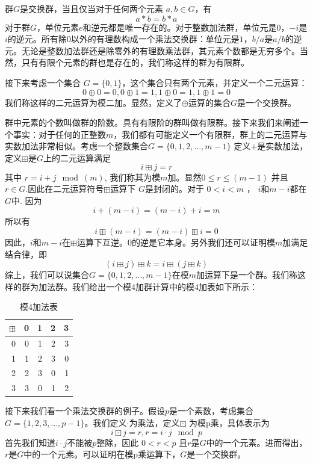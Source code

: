 \documentclass[10pt,a4paper,UTF8]{article}
\begin{document}
群\(G\)是交换群，当且仅当对于任何两个元素 \(a,b\in G\)，有 \[a*b=b*a\] 对于群\(G\)，单位元素\(e\)和逆元都是唯一存在的。对于整数加法群，单位元是\(0\)，\(-i\)是\(i\)的逆元。所有除0以外的有理数构成一个乘法交换群：单位元是\(1\)，\(b/a\)是\(a/b\)的逆元。无论是整数加法群还是除零外的有理数乘法群，其元素个数都是无穷多个。当然，只有有限个元素的群也是存在的，我们称这样的群为有限群。

接下来考虑一个集合 \(G = \{0,1\}\)，这个集合只有两个元素，并定义一个二元运算：\[0\oplus 0 =0, 0\oplus 1=1, 1\oplus 0 = 1, 1\oplus 1 = 0\] 我们称这样的二元运算为模二加。显然，定义了\(\oplus\)运算的集合\(G\)是一个交换群。

群中元素的个数叫做群的阶数。具有有限阶的群叫做有限群。接下来我们来阐述一个事实：对于任何的正整数\(m\)，我们都有可能定义一个有限群，群上的二元运算与实数加法非常相似。考虑一个整数集合\(G=\{0,1,2,\ldots,m-1\}\)  定义\(+\)是实数加法，定义\(\boxplus\)是\(G\)上的二元运算满足 \[i\boxplus j = r \] 其中 \(r = i+j \mod(m)\), 我们称其为模\(m\)加。显然\(0 \leq r \leq (m-1)\) 并且\(r\in G\).因此在二元运算符号\(\boxplus\)运算下 \(G\)是封闭的。对于 \(0 < i < m\) ， \(i\)和\(m-i\)都在\(G\)中. 因为 \[i + (m-i) = (m-i) + i = m\] 所以有\[i\boxplus (m-i) = (m-i)\boxplus i = 0\] 因此，\(i\)和\(m-i\)在\(\boxplus\)运算下互逆。\(0\)的逆是它本身。另外我们还可以证明模\(m\)加满足结合律，即\[(i\boxplus j)\boxplus k = i \boxplus ( j \boxplus k)\] 综上，我们可以说集合\(G=\{0,1,2,\ldots,m-1\}\)在模\(m\)加运算下是一个群。我们称这样的群为加法群。我们给出一个模4加群计算中的模4加表如下所示：

\begin{table}[htbp]
\caption{\label{tab:org2011b09}
模4加法表}
\centering
\begin{tabular}{rrrrr}
\hline
\(\boxplus\) & 0 & 1 & 2 & 3\\
\hline
0 & 0 & 1 & 2 & 3\\
1 & 1 & 2 & 3 & 0\\
2 & 2 & 3 & 0 & 1\\
3 & 3 & 0 & 1 & 2\\
\hline
\end{tabular}
\end{table}

接下来我们看一个乘法交换群的例子。假设\(p\)是一个素数，考虑集合\(G = \{1,2,3,\ldots,p-1\}\)。我们定义\(\cdot\)为乘法，定义\(\boxdot\) 为模p乘，具体表示为 \[i\boxdot j = r, r = i\cdot j \mod p\] 首先我们知道\(i\cdot j\)不能被\(p\)整除，因此 \(0 < r < p\) 且\(r\)是\(G\)中的一个元素。进而得出，\(r\)是\(G\)中的一个元素。可以证明在模p乘运算下，\(G\)是一个交换群。
\end{document}
